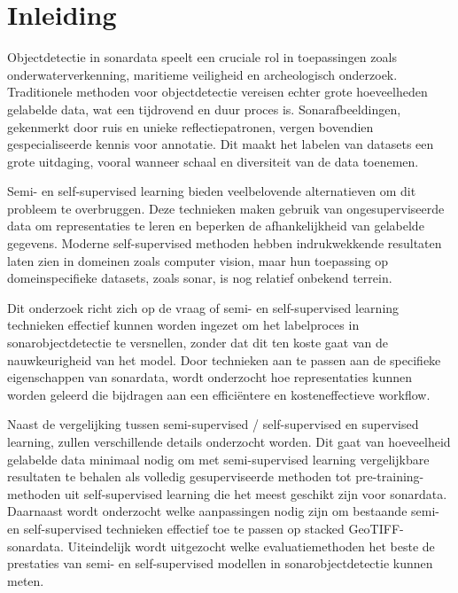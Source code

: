 
\section{Inleiding}%
\label{sec:inleiding}

Objectdetectie in sonardata speelt een cruciale rol in toepassingen zoals onderwaterverkenning, maritieme veiligheid en archeologisch onderzoek. Traditionele methoden voor objectdetectie vereisen echter grote hoeveelheden gelabelde data, wat een tijdrovend en duur proces is. Sonarafbeeldingen, gekenmerkt door ruis en unieke reflectiepatronen, vergen bovendien gespecialiseerde kennis voor annotatie. Dit maakt het labelen van datasets een grote uitdaging, vooral wanneer schaal en diversiteit van de data toenemen.

Semi- en self-supervised learning bieden veelbelovende alternatieven om dit probleem te overbruggen. Deze technieken maken gebruik van ongesuperviseerde data om representaties te leren en beperken de afhankelijkheid van gelabelde gegevens. Moderne self-supervised methoden hebben indrukwekkende resultaten laten zien in domeinen zoals computer vision, maar hun toepassing op domeinspecifieke datasets, zoals sonar, is nog relatief onbekend terrein.

Dit onderzoek richt zich op de vraag of semi- en self-supervised learning technieken effectief kunnen worden ingezet om het labelproces in sonarobjectdetectie te versnellen, zonder dat dit ten koste gaat van de nauwkeurigheid van het model. Door technieken aan te passen aan de specifieke eigenschappen van sonardata, wordt onderzocht hoe representaties kunnen worden geleerd die bijdragen aan een efficiëntere en kosteneffectieve workflow.

Naast de vergelijking tussen semi-supervised / self-supervised en supervised learning, zullen verschillende details onderzocht worden. Dit gaat van hoeveelheid gelabelde data minimaal nodig om met semi-supervised learning vergelijkbare resultaten te behalen als volledig gesuperviseerde methoden tot pre-training-methoden uit self-supervised learning die het meest geschikt zijn voor sonardata. Daarnaast wordt onderzocht welke aanpassingen nodig zijn om bestaande semi- en self-supervised technieken effectief toe te passen op stacked GeoTIFF-sonardata. Uiteindelijk wordt uitgezocht welke evaluatiemethoden het beste de prestaties van semi- en self-supervised modellen in sonarobjectdetectie kunnen meten.

